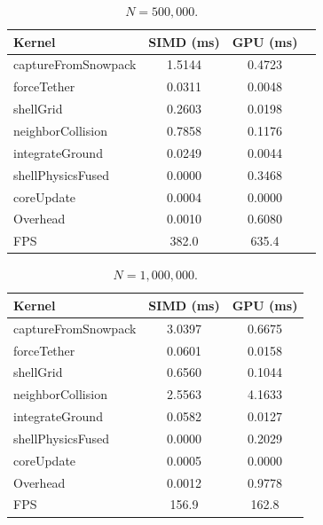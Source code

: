 \begin{table}[H]
  \caption{$N = 500{,}000$.}
  \label{tab:jetson_scaling_500k}
  \centering
  \scriptsize
  \begin{tabular}{@{}lccc@{}}
    \toprule
    \textbf{Kernel} & \textbf{SIMD (ms)} & \textbf{GPU (ms)} \\
    \midrule
    captureFromSnowpack        & 1.5144 & 0.4723 \\
    forceTether                & 0.0311 & 0.0048 \\
    shellGrid                  & 0.2603 & 0.0198 \\
    neighborCollision          & 0.7858 & 0.1176 \\
    integrateGround            & 0.0249 & 0.0044 \\
    shellPhysicsFused          & 0.0000 & 0.3468 \\
    coreUpdate                 & 0.0004 & 0.0000 \\
    Overhead                   & 0.0010 & 0.6080 \\
    \bottomrule
    FPS                        & 382.0 & 635.4 \\
  \end{tabular}
\end{table}

\begin{table}[H]
  \caption{$N = 1{,}000{,}000$.}
  \label{tab:jetson_scaling_1m}
  \centering
  \scriptsize
  \begin{tabular}{@{}lcc@{}}
    \toprule
    \textbf{Kernel} & \textbf{SIMD (ms)} & \textbf{GPU (ms)} \\
    \midrule
    captureFromSnowpack        & 3.0397 & 0.6675 \\
    forceTether                & 0.0601 & 0.0158 \\
    shellGrid                  & 0.6560 & 0.1044 \\
    neighborCollision          & 2.5563 & 4.1633 \\
    integrateGround            & 0.0582 & 0.0127 \\
    shellPhysicsFused          & 0.0000 & 0.2029 \\
    coreUpdate                 & 0.0005 & 0.0000 \\
    Overhead                   & 0.0012 & 0.9778 \\
    \bottomrule
    FPS                        & 156.9 & 162.8 \\
  \end{tabular}
\end{table}

